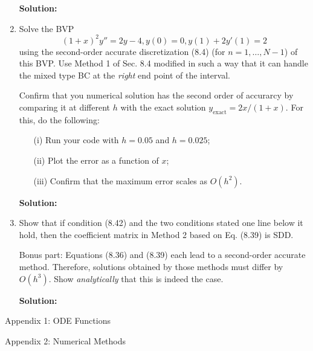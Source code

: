 \documentclass[11pt]{article}
\newcommand{\oh}[1]{O(h^{{#1}})}
\begin{document}
\begin{enumerate}
\bigskip
\textbf{Solution:} 

\item Solve the BVP
\[ (1+x)^2 y'' = 2y-4 , y(0) =  0, y(1) + 2y'(1) = 2 \]
using the second-order accurate discretization (8.4) (for $n = 1,\ldots,N-1$) of this BVP.
Use Method 1 of Sec. 8.4 modified in such a way that it can handle the mixed type BC at the {\em right} end point of the interval.

Confirm that you numerical solution has the second order of accurarcy by comparing it at different $h$ with the exact solution $y_\text{exact} = 2x/(1+x)$.
For this, do the following:
\begin{enumerate}
\item[(i)] Run your code with $h = 0.05$ and $h = 0.025$;
\item[(ii)] Plot the error as a function of $x$;
\item[(iii)] Confirm that the maximum error scales as $O(h^2)$.
\end{enumerate}

\bigskip
\textbf{Solution:} 

\item Show that if condition (8.42) and the two conditions stated one line below it hold, then the coefficient matrix in Method 2 based on Eq. (8.39) is SDD.

Bonus part: Equations (8.36) and (8.39) each lead to a second-order accurate method.
Therefore, solutions obtained by those methods must differ by $\oh{3}$.
Show {\em analytically} that this is indeed the case.

\bigskip
\textbf{Solution:} 

\end{enumerate}

\clearpage
\pagebreak
{\huge Appendix 1: ODE Functions}

\clearpage
\pagebreak
{\huge Appendix 2: Numerical Methods}

\end{document}
